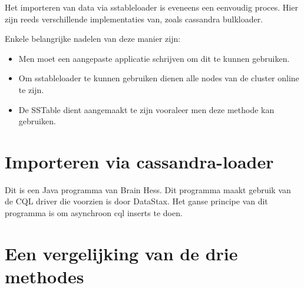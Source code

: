 Het importeren van data via sstableloader is eveneens een eenvoudig proces.
Hier zijn reeds verschillende implementaties van, zoals cassandra bulkloader.

Enkele belangrijke nadelen van deze manier zijn:
\begin{itemize}
	\item Men moet een aangepaste applicatie schrijven om dit te kunnen gebruiken.
	\item Om sstableloader te kunnen gebruiken dienen alle nodes van de cluster online te zijn.
	\item De SSTable dient aangemaakt te zijn vooraleer men deze methode kan gebruiken.
\end{itemize}

\section{Importeren via cassandra-loader}
Dit is een Java programma van Brain Hess.
Dit programma maakt gebruik van de CQL driver die voorzien is door DataStax.
Het ganse principe van dit programma is om asynchroon cql inserts te doen.

\section{Een vergelijking van de drie methodes}
